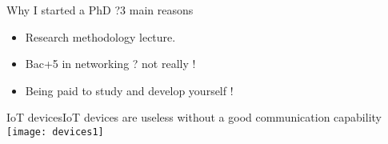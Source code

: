 
\begin{frame}{Why I started a PhD ?}{3 main reasons}
	\begin{itemize}
		\item Research methodology lecture.
		\item Bac+5 in networking ? not really !
		\item Being paid to study and develop yourself !
	\end{itemize}
\end{frame}

\begin{frame}{IoT devices}{IoT devices are useless without a good communication capability}
	\centering
	\texttt{[image: devices1]}
\end{frame}

